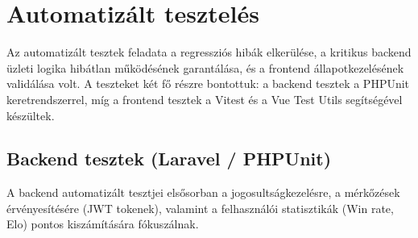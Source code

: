 \section{Automatizált tesztelés}

Az automatizált tesztek feladata a regressziós hibák elkerülése, a kritikus backend üzleti logika hibátlan működésének garantálása, és a frontend állapotkezelésének validálása volt. A teszteket két fő részre bontottuk: a backend tesztek a PHPUnit keretrendszerrel, míg a frontend tesztek a Vitest és a Vue Test Utils segítségével készültek.

\subsection{Backend tesztek (Laravel / PHPUnit)}

A backend automatizált tesztjei elsősorban a jogosultságkezelésre, a mérkőzések érvényesítésére (JWT tokenek), valamint a felhasználói statisztikák (Win rate, Elo) pontos kiszámítására fókuszálnak.

